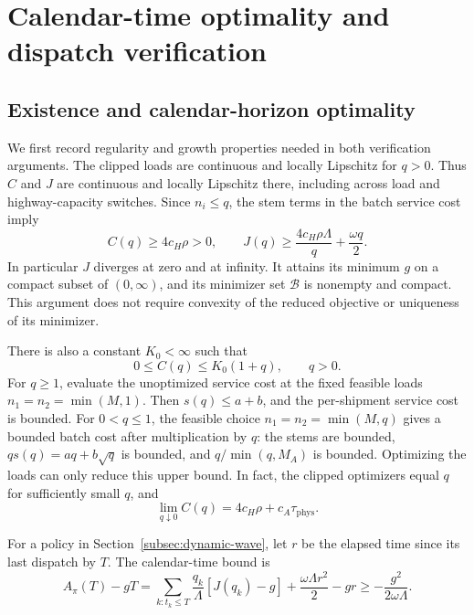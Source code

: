 \section{Calendar-time optimality and dispatch verification}
\label{app:dispatch}

\subsection{Existence and calendar-horizon optimality}

We first record regularity and growth properties needed in both verification
arguments. The clipped loads are continuous and locally Lipschitz for
$q>0$. Thus $C$ and $J$ are continuous and locally Lipschitz there, including
across load and highway-capacity switches. Since $n_i\le q$, the stem terms
in the batch service cost imply
\begin{equation}
 C(q)\ge4c_H\rho>0,
 \qquad
 J(q)\ge\frac{4c_H\rho\Lambda}q+\frac{\omega q}2.
 \label{eq:proof-growth-lower}
\end{equation}
In particular $J$ diverges at zero and at infinity. It attains its minimum
$g$ on a compact subset of $(0,\infty)$, and its minimizer set
$\mathcal B$ is nonempty and compact. This argument does not require
convexity of the reduced objective or uniqueness of its minimizer.

There is also a constant $K_0<\infty$ such that
\begin{equation}
 0\le C(q)\le K_0(1+q),\qquad q>0.
 \label{eq:proof-growth-upper}
\end{equation}
For $q\ge1$, evaluate the unoptimized service cost at the fixed feasible
loads $n_1=n_2=\min(M,1)$. Then $s(q)\le a+b$, and the per-shipment
service cost is bounded. For $0<q\le1$, the feasible choice
$n_1=n_2=\min(M,q)$ gives a bounded batch cost after multiplication by
$q$: the stems are bounded, $qs(q)=aq+b\sqrt q$ is bounded, and
$q/\min(q,M_A)$ is bounded. Optimizing the loads can only reduce this
upper bound. In fact, the clipped optimizers equal $q$ for sufficiently
small $q$, and
\begin{equation}
 \lim_{q\downarrow0}C(q)=4c_H\rho+c_A\tau_{\mathrm{phys}}.
 \label{eq:proof-zero-limit}
\end{equation}

For a policy in Section~\ref{subsec:dynamic-wave}, let $r$ be the elapsed
time since its last dispatch by $T$. The calendar-time bound is
\begin{equation}
 A_\pi(T)-gT
 =\sum_{k:t_k\le T}\frac{q_k}{\Lambda}[J(q_k)-g]
     +\frac{\omega\Lambda r^2}2-gr
 \ge-\frac{g^2}{2\omega\Lambda}.
 \label{eq:analysis-calendar-bound}
\end{equation}

